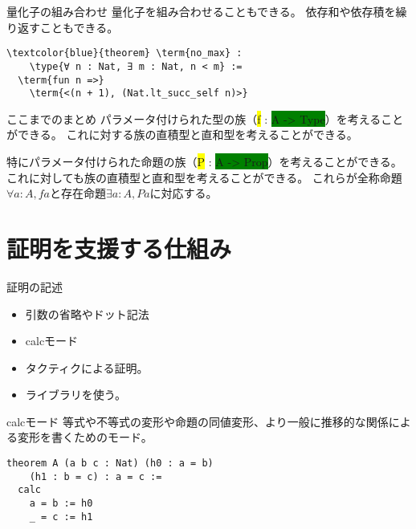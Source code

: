 \documentclass[unicode,12pt]{beamer}%
\newcommand{\type}[1]{\colorbox{green}{#1}}
\newcommand{\term}[1]{\colorbox{yellow}{#1}}
\begin{document}
\begin{frame}[fragile]{量化子の組み合わせ}
  量化子を組み合わせることもできる。
  依存和や依存積を繰り返すこともできる。

  \begin{tcolorbox}[title=Quantifier.lean]
    \setlength{\baselineskip}{12pt}
    \begin{Verbatim}[commandchars=\\\{\}, baselinestretch=1.5]
\textcolor{blue}{theorem} \term{no_max} :
    \type{∀ n : Nat, ∃ m : Nat, n < m} :=
  \term{fun n =>}
    \term{<(n + 1), (Nat.lt_succ_self n)>}
    \end{Verbatim}
    \end{tcolorbox}  
\end{frame}

\begin{frame}{ここまでのまとめ}
  パラメータ付けられた型の族（\term{f} : \type{A -> Type}）を考えることができる。
  これに対する族の直積型と直和型を考えることができる。

  特にパラメータ付けられた命題の族（\term{P} : \type{A -> Prop}）を考えることができる。
  これに対しても族の直積型と直和型を考えることができる。
  これらが全称命題$\forall a : A, f a$と存在命題$\exists a : A, P a$に対応する。
\end{frame}

\section{証明を支援する仕組み}

\begin{frame}{証明の記述}
  \begin{itemize}
    \item 引数の省略やドット記法
    \item calcモード
    \item タクティクによる証明。
    \item ライブラリを使う。
  \end{itemize}
\end{frame}

\begin{frame}[fragile]{calcモード}
  等式や不等式の変形や命題の同値変形、より一般に推移的な関係による変形を書くためのモード。
  \begin{tcolorbox}[title=Assist.lean]
    \setlength{\baselineskip}{12pt}
    \begin{Verbatim}[commandchars=\\\{\}, baselinestretch=1.5]
theorem A (a b c : Nat) (h0 : a = b)
    (h1 : b = c) : a = c :=
  calc
    a = b := h0
    _ = c := h1  
    \end{Verbatim}
    \end{tcolorbox}  
\end{frame}
\end{document}
